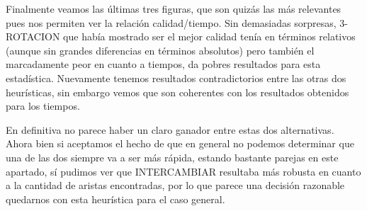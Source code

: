 Finalmente veamos las últimas tres figuras, que son quizás las más relevantes pues nos permiten ver la relación calidad/tiempo. Sin demasiadas sorpresas, 3-ROTACION que había mostrado ser el mejor calidad tenía en términos relativos (aunque sin grandes diferencias en términos absolutos) pero también el marcadamente peor en cuanto a tiempos, da pobres resultados para esta estadística. Nuevamente tenemos resultados contradictorios entre las otras dos heurísticas, sin embargo vemos que son coherentes con los resultados obtenidos para los tiempos. 

En definitiva no parece haber un claro ganador entre estas dos alternativas. Ahora bien si aceptamos el hecho de que en general no podemos determinar que una de las dos siempre va a ser más rápida, estando bastante parejas en este apartado, sí pudimos ver que INTERCAMBIAR resultaba más robusta en cuanto a la cantidad de aristas encontradas, por lo que parece una decisión razonable quedarnos con esta heurística para el caso general. 

